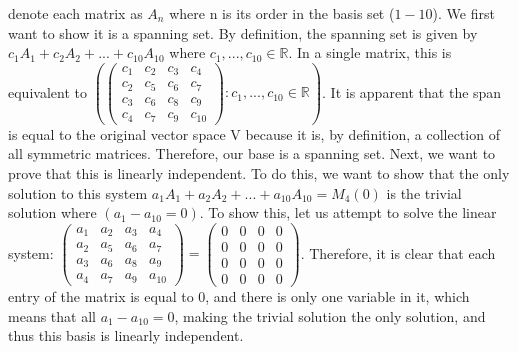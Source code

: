 \documentclass{article}
\begin{document}
\begin{enumerate}
\begin{enumerate}
denote each matrix as $A_n$ where n is its order in the basis set ($1 - 10$). We first want to show it is a spanning set. By definition, the spanning set is given by $c_1 A_1 + c_2 A_2 + ... + c_{10} A_{10}$ where $c_1,...,c_{10} \in \mathbb{R}$. In a single matrix, this is equivalent to $\left(\left(\begin{array}{cccc} c_1 & c_2 & c_3 & c_4 \\ c_2 & c_5 & c_6 & c_7 \\ c_3 & c_6 & c_8 & c_9 \\ c_4 & c_7 & c_9 & c_{10} \end{array}\right): c_1,...,c_{10} \in \mathbb{R} \right)$. It is apparent that the span is equal to the original vector space V because it is, by definition, a collection of all symmetric matrices. Therefore, our base is a spanning set. Next, we want to prove that this is linearly independent. To do this, we want to show that the only solution to this system $a_1 A_1 + a_2 A_2 + ... + a_{10} A_{10} = M_4(0)$ is the trivial solution where $(a_1 - a_{10} = 0)$. To show this, let us attempt to solve the linear system: $\left(\begin{array}{cccc} a_1 & a_2 & a_3 & a_4 \\ a_2 & a_5 & a_6 & a_7 \\ a_3 & a_6 & a_8 & a_9 \\ a_4 & a_7 & a_9 & a_{10} \end{array}\right) = \left(\begin{array}{cccc} 0 & 0 & 0 & 0 \\ 0 & 0 & 0 & 0 \\ 0 & 0 & 0 & 0 \\ 0 & 0 & 0 & 0 \end{array}\right)$. Therefore, it is clear that each entry of the matrix is equal to 0, and there is only one variable in it, which means that all $a_1 - a_{10} = 0$, making the trivial solution the only solution, and thus this basis is linearly independent.


\end{enumerate}
\end{enumerate}
\end{document}
